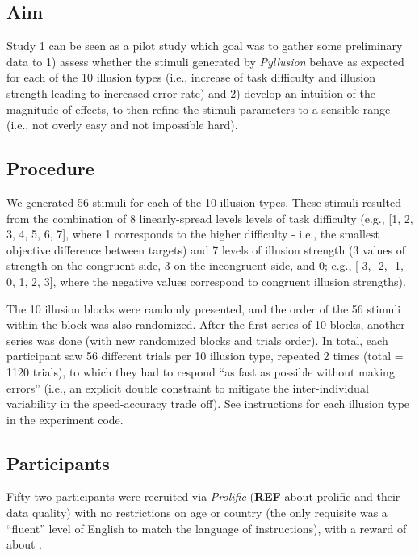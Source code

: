 \documentclass[
  man,floatsintext]{apa6}
\begin{document}
\hypertarget{aim}{%
\subsection{Aim}\label{aim}}

Study 1 can be seen as a pilot study which goal was to gather some preliminary data to 1) assess whether the stimuli generated by \emph{Pyllusion} behave as expected for each of the 10 illusion types (i.e., increase of task difficulty and illusion strength leading to increased error rate) and 2) develop an intuition of the magnitude of effects, to then refine the stimuli parameters to a sensible range (i.e., not overly easy and not impossible hard).

\hypertarget{procedure}{%
\subsection{Procedure}\label{procedure}}

We generated 56 stimuli for each of the 10 illusion types. These stimuli resulted from the combination of 8 linearly-spread levels levels of task difficulty (e.g., {[}1, 2, 3, 4, 5, 6, 7{]}, where 1 corresponds to the higher difficulty - i.e., the smallest objective difference between targets) and 7 levels of illusion strength (3 values of strength on the congruent side, 3 on the incongruent side, and 0; e.g., {[}-3, -2, -1, 0, 1, 2, 3{]}, where the negative values correspond to congruent illusion strengths).

The 10 illusion blocks were randomly presented, and the order of the 56 stimuli within the block was also randomized. After the first series of 10 blocks, another series was done (with new randomized blocks and trials order). In total, each participant saw 56 different trials per 10 illusion type, repeated 2 times (total = 1120 trials), to which they had to respond ``as fast as possible without making errors'' (i.e., an explicit double constraint to mitigate the inter-individual variability in the speed-accuracy trade off). See instructions for each illusion type in the experiment code.

\hypertarget{participants}{%
\subsection{Participants}\label{participants}}

Fifty-two participants were recruited via \emph{Prolific} (\textbf{REF} about prolific and their data quality) with no restrictions on age or country (the only requisite was a ``fluent'' level of English to match the language of instructions), with a reward of about .
\end{document}
